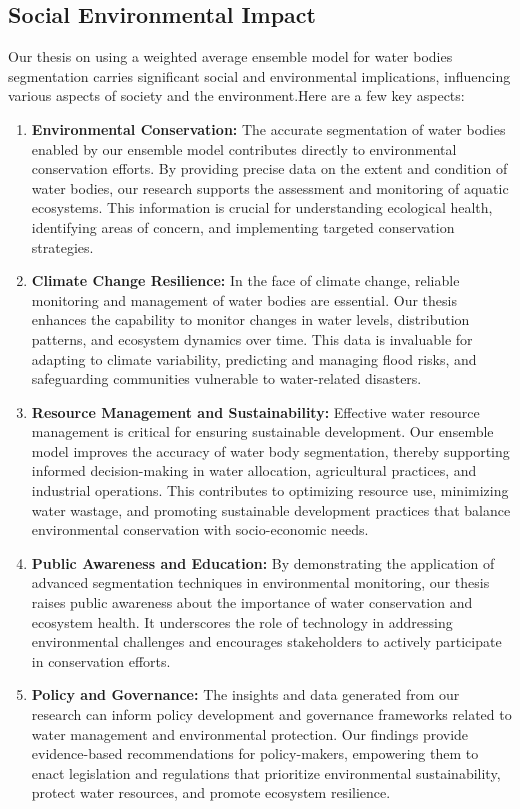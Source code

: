 \subsection{Social Environmental Impact}
Our thesis on using a weighted average ensemble model for water bodies segmentation carries significant social and environmental implications, influencing various aspects of society and the environment.Here are a few key aspects:
\begin{enumerate}
    \item \textbf{Environmental Conservation: }The accurate segmentation of water bodies enabled by our ensemble model contributes directly to environmental conservation efforts. By providing precise data on the extent and condition of water bodies, our research supports the assessment and monitoring of aquatic ecosystems. This information is crucial for understanding ecological health, identifying areas of concern, and implementing targeted conservation strategies.
    
    \item \textbf{Climate Change Resilience: }In the face of climate change, reliable monitoring and management of water bodies are essential. Our thesis enhances the capability to monitor changes in water levels, distribution patterns, and ecosystem dynamics over time. This data is invaluable for adapting to climate variability, predicting and managing flood risks, and safeguarding communities vulnerable to water-related disasters. 
    
    \item \textbf{Resource Management and Sustainability: }Effective water resource management is critical for ensuring sustainable development. Our ensemble model improves the accuracy of water body segmentation, thereby supporting informed decision-making in water allocation, agricultural practices, and industrial operations. This contributes to optimizing resource use, minimizing water wastage, and promoting sustainable development practices that balance environmental conservation with socio-economic needs.
    
    \item \textbf{Public Awareness and Education: }By demonstrating the application of advanced segmentation techniques in environmental monitoring, our thesis raises public awareness about the importance of water conservation and ecosystem health. It underscores the role of technology in addressing environmental challenges and encourages stakeholders to actively participate in conservation efforts.
    
    \item \textbf{Policy and Governance: }The insights and data generated from our research can inform policy development and governance frameworks related to water management and environmental protection. Our findings provide evidence-based recommendations for policy-makers, empowering them to enact legislation and regulations that prioritize environmental sustainability, protect water resources, and promote ecosystem resilience.
   
\end{enumerate}

